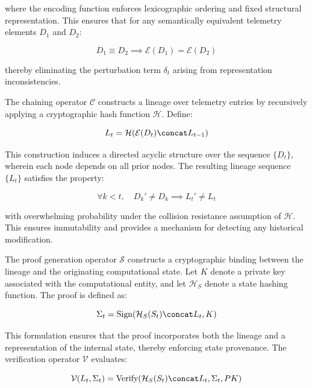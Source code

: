 where the encoding function enforces lexicographic ordering and fixed structural representation. This ensures that for any semantically equivalent telemetry elements $D_1$ and $D_2$:

\begin{equation}
D_1 \equiv D_2 \implies \mathcal{E}(D_1) = \mathcal{E}(D_2)
\end{equation}

thereby eliminating the perturbation term $\delta_t$ arising from representation inconsistencies.

The chaining operator $\mathcal{C}$ constructs a lineage over telemetry entries by recursively applying a cryptographic hash function $\mathcal{H}$. Define:

\begin{equation}
L_t = \mathcal{H}(\mathcal{E}(D_t) \concat L_{t-1})
\end{equation}

This construction induces a directed acyclic structure over the sequence $\{D_t\}$, wherein each node depends on all prior nodes. The resulting lineage sequence $\{L_t\}$ satisfies the property:

\begin{equation}
\forall k < t, \quad D_k' \neq D_k \implies L_t' \neq L_t
\end{equation}

with overwhelming probability under the collision resistance assumption of $\mathcal{H}$. This ensures immutability and provides a mechanism for detecting any historical modification.

The proof generation operator $\mathcal{S}$ constructs a cryptographic binding between the lineage and the originating computational state. Let $K$ denote a private key associated with the computational entity, and let $\mathcal{H}_S$ denote a state hashing function. The proof is defined as:

\begin{equation}
\Sigma_t = \text{Sign}(\mathcal{H}_S(S_t) \concat L_t, K)
\end{equation}

This formulation ensures that the proof incorporates both the lineage and a representation of the internal state, thereby enforcing state provenance. The verification operator $\mathcal{V}$ evaluates:

\begin{equation}
\mathcal{V}(L_t, \Sigma_t) = \text{Verify}(\mathcal{H}_S(S_t) \concat L_t, \Sigma_t, PK)
\end{equation}


